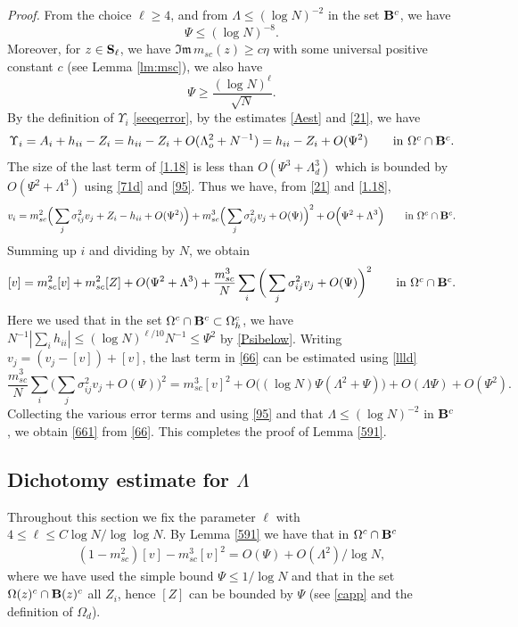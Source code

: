 \documentclass[draft]{article}
\newcommand{\be}{\begin{equation}}
\newcommand{\ee}{\end{equation}}
\newcommand{\barv}{ {[ v ]}}
\newcommand{\barZ}{ {[ Z ]}}
\newcommand{\im}{{\mathfrak{Im} \, }}
\newcommand{\bS}{ {\bf  S}}
\newcommand{\qed}{\hfill\fbox{}\par\vspace{0.3mm}}
\numberwithin{equation}{section}
\numberwithin{theorem}{section}
\numberwithin{definition}{section}
\numberwithin{remark}{section}
\begin{document}
\medskip 

{\it Proof.} {F}rom the choice   $\ell \ge 4$, and
from $\Lambda  \le (\log N)^{-2}$ in the set ${\bf B}^c$, we have
\be\label{95}
 \Psi  \le (\log N)^{-8} .
\ee
Moreover, for $z\in \bS_\ell$, we have $\im m_{sc}(z)\ge c\eta$ with
some universal positive constant $c$ (see Lemma \ref{lm:msc}), we also have
\be
  \Psi\ge \frac{(\log N)^\ell}{\sqrt{N}}.
\label{Psibelow}
\ee
By the definition of $\Upsilon_i$ \eqref{seeqerror}, by the estimates \eqref{Aest} and 
 \eqref{21},  we have
\be\label{511}
\Upsilon_i= A_i +h_{ii}-Z_i = h_{ii} - Z_i + O(\Lambda_o^2 + N^{-1} ) = h_{ii}- Z_i + O(\Psi^2 )
\qquad \mbox{in $\Omega^c\cap {\bf B}^c$}.
\ee
The size of the last term of \eqref{1.18} is less than
 $O(    \Psi^3+\Lambda_d^3)$ which is bounded by $O(    \Psi^2+\Lambda^3)$
using \eqref{71d} and \eqref{95}.
Thus we have,  from \eqref{21} and \eqref{1.18},
\be
v_i = m^2_{sc} \Big(\sum_{j}\sigma^2_{ij}v_j + Z_i -h_{ii}+ 
O(\Psi^2 ) \Big)+m^3_{sc} \Big(\sum_{j}\sigma^2_{ij}v_j+  O(\Psi )  \Big)^2+
   O \Big(     \Psi^2+\Lambda^3\Big)\qquad \mbox{in $\Omega^c\cap {\bf B}^c$}.
\ee
Summing  up $i$ and dividing by $N$, we obtain
\be\label{66}
 \barv =m^2_{sc}\barv + m^2_{sc}\barZ   + O(      \Psi^2+  \Lambda^3)
+\frac{m_{sc}^3}N\sum_i\bigg(\sum_{j}\sigma^2_{ij}v_j+  O(\Psi )  \bigg )^2  
\qquad \mbox{in $\Omega^c\cap {\bf B}^c$}.
\ee
Here we used that in  the set $\Omega^c\cap {\bf B}^c\subset\Omega_h^c$,
we have $N^{-1}|\sum_i h_{ii}|\le (\log N)^{\ell/10}N^{-1} \le \Psi^2$ by \eqref{Psibelow}.
Writing $v_j = (v_j -\barv)+\barv$, the last term in \eqref{66} can be estimated
using \eqref{llld}
$$ 
\frac{m_{sc}^3}N\sum_i\bigg(\sum_{j}\sigma^2_{ij}v_j+  O(\Psi )  \bigg )^2 
  = m_{sc}^3 {\barv}^2  + O\big( (\log N)\Psi(\Lambda^2 +\Psi)\big)+ O(\Lambda\Psi)+
 O(\Psi^2). 
$$
Collecting the various error terms and using \eqref{95} and
that  $\Lambda\le (\log N)^{-2}$ in
${\bf B}^c$,  we obtain \eqref{661} from \eqref{66}.
This completes the proof of  Lemma \ref{591}.  \qed







\subsection{Dichotomy estimate for $\Lambda$}


 
 Throughout this section we fix the parameter $\ell$ with 
$4\le \ell \le C\log N/\log\log N$.
By Lemma \ref{591} we have that in  $\Omega^c\cap {\bf B}^c$
\begin{align}\label{m-m2}
(1-m^2_{sc}) \barv - m_{sc}^3 \barv^2  =  O(     \Psi )+  O(\Lambda^2)/\log N,
\end{align}
where we have used the simple bound $\Psi \le 1/\log N$ and
that in the set $\Omega(z)^c \cap {\bf B}(z)^c$ all $Z_i$, hence $\barZ$ can be bounded
by $\Psi$ (see \eqref{capp} and the definition of $\Omega_d$).
\end{document}
